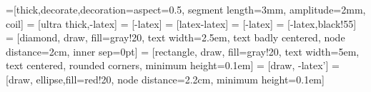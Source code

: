 \usepackage{pgf,tikz}
\usetikzlibrary{backgrounds}
\usetikzlibrary{calc}
\usetikzlibrary{decorations}
\usetikzlibrary{decorations.pathmorphing,patterns}
\usetikzlibrary{decorations.markings}
\usetikzlibrary{intersections}
\usetikzlibrary{positioning}
\usetikzlibrary{spy}
=[thick,decorate,decoration={aspect=0.5, segment length=3mm, amplitude=2mm, coil}]
   = [ultra thick,-latex]
 = [-latex]
    = [latex-latex]
   = [-latex]
   = [-latex,black!55]
 = [diamond, draw, fill=gray!20, 
    text width=2.5em, text badly centered, node distance=2cm, inner sep=0pt]
 = [rectangle, draw, fill=gray!20, 
    text width=5em, text centered, rounded corners, minimum height=0.1em]
 = [draw, -latex']
 = [draw, ellipse,fill=red!20, node distance=2.2cm,
    minimum height=0.1em]

\renewcommand{\bfdefault}{sbc}
%
%
%
%
\newcommand{\blue}{\textcolor{blue}}
\newcommand{\red}{\textcolor{red}}
\newcommand{\violet}{\textcolor{VioletEMSE}}
\newcommand{\green}{\textcolor{green}}
\newcommand{\yellow}{\textcolor{yellow}}
\newcommand{\white}{\textcolor{white}}
\newcommand{\black}{\textcolor{black}}
\newcommand{\cyan}{\textcolor{cyan}}
\newcommand{\gray}{\textcolor{GrayEMSE}}
\newcommand{\orange}{\textcolor{orange}}
%
% 
\title{\TITULO}
\subtitle{\SUBTITULO}
\date{\gray{\FECHA}}
%
%
%




